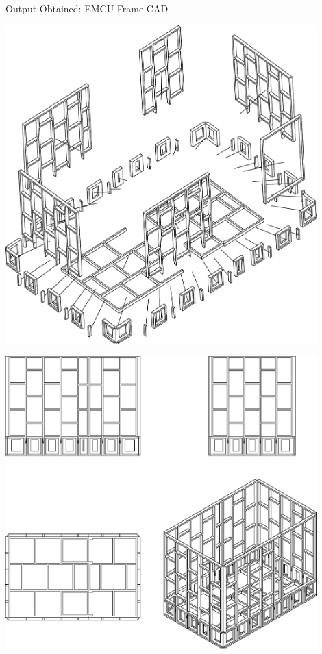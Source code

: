 \documentclass{beamer}
\begin{document}
\begin{frame} {Output Obtained: EMCU Frame CAD}

    \begin{center}
        \vspace{0.25cm}
        \begin{minipage} {0.49\textwidth}
            \begin{center}
                \includegraphics[width = 0.9\textwidth]{frame_explode.pdf}
            \end{center}
        \end{minipage}
        \begin{minipage} {0.45\textwidth}
            \vspace{0.5cm}
            \begin{center}
                \includegraphics[width = 0.9\textwidth]{frame_views.pdf}
            \end{center}
        \end{minipage}


\end{center}
\end{frame}
\end{document}
